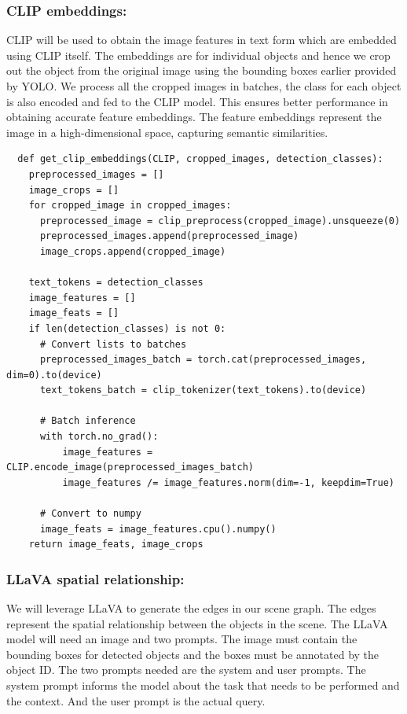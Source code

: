 \subsubsection{CLIP embeddings:}
CLIP will be used to obtain the image features in text form which are embedded using CLIP itself. The embeddings are for individual objects and hence we crop 
out the object from the original image using the bounding boxes earlier provided by YOLO. We process all the cropped images in batches, the class for each object is 
also encoded and fed to the CLIP model. This ensures better performance in obtaining accurate feature embeddings. The feature embeddings represent the image in a 
high-dimensional space, capturing semantic similarities.
\begin{lstlisting}
  def get_clip_embeddings(CLIP, cropped_images, detection_classes):
    preprocessed_images = []
    image_crops = []
    for cropped_image in cropped_images:  
      preprocessed_image = clip_preprocess(cropped_image).unsqueeze(0)
      preprocessed_images.append(preprocessed_image)
      image_crops.append(cropped_image)
    
    text_tokens = detection_classes
    image_features = []
    image_feats = []
    if len(detection_classes) is not 0:
      # Convert lists to batches
      preprocessed_images_batch = torch.cat(preprocessed_images, dim=0).to(device)
      text_tokens_batch = clip_tokenizer(text_tokens).to(device)

      # Batch inference
      with torch.no_grad():
          image_features = CLIP.encode_image(preprocessed_images_batch)
          image_features /= image_features.norm(dim=-1, keepdim=True)

      # Convert to numpy
      image_feats = image_features.cpu().numpy()
    return image_feats, image_crops
\end{lstlisting}

\subsubsection{LLaVA spatial relationship:}
We will leverage LLaVA to generate the edges in our scene graph. The edges represent the spatial relationship between the objects in the scene. 
The LLaVA model will need an image and two prompts. The image must contain the bounding boxes for detected objects and the boxes must be annotated by the object ID. 
The two prompts needed are the system and user prompts. The system prompt informs the model about the task that needs to be performed and the context. 
And the user prompt is the actual query. 

